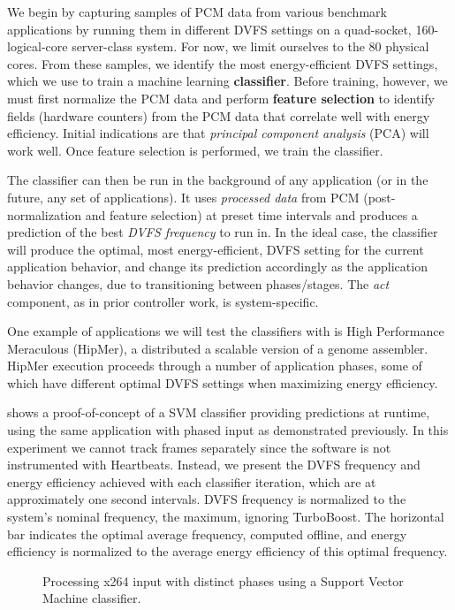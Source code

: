We begin by capturing samples of PCM data from various benchmark applications by running them in different DVFS settings on a quad-socket, 160-logical-core server-class system.
For now, we limit ourselves to the 80 physical cores.
From these samples, we identify the most energy-efficient DVFS settings, which we use to train a machine learning \textbf{classifier}.
Before training, however, we must first normalize the PCM data and perform \textbf{feature selection} to identify fields (hardware counters) from the PCM data that correlate well with energy efficiency.
Initial indications are that \emph{principal component analysis} (PCA) will work well.
Once feature selection is performed, we train the classifier.

The classifier can then be run in the background of any application (or in the future, any set of applications).
It uses \emph{processed data} from PCM (post-normalization and feature selection) at preset time intervals and produces a prediction of the best \emph{DVFS frequency} to run in.
In the ideal case, the classifier will produce the optimal, \ie most energy-efficient, DVFS setting for the current application behavior, and change its prediction accordingly as the application behavior changes, \eg due to transitioning between phases/stages.
The \emph{act} component, as in prior controller work, is system-specific.

One example of applications we will test the classifiers with is High Performance Meraculous (HipMer), a distributed a scalable version of a genome assembler.
HipMer execution proceeds through a number of application phases, some of which have different optimal DVFS settings when maximizing energy efficiency.

 shows a proof-of-concept of a SVM classifier providing predictions at runtime, using the same  application with phased input as demonstrated previously.
In this experiment we cannot track frames separately since the software is not instrumented with Heartbeats.
Instead, we present the DVFS frequency and energy efficiency achieved with each classifier iteration, which are at approximately one second intervals.
DVFS frequency is normalized to the system's nominal frequency, \ie the maximum, ignoring TurboBoost.
The horizontal bar indicates the optimal average frequency, computed offline, and energy efficiency is normalized to the average energy efficiency of this optimal frequency.

\begin{figure}[t]
  
  \caption{Processing x264 input with distinct phases using a Support Vector Machine classifier.}
  \label{fig:classifier-phases-x264}
\end{figure}

